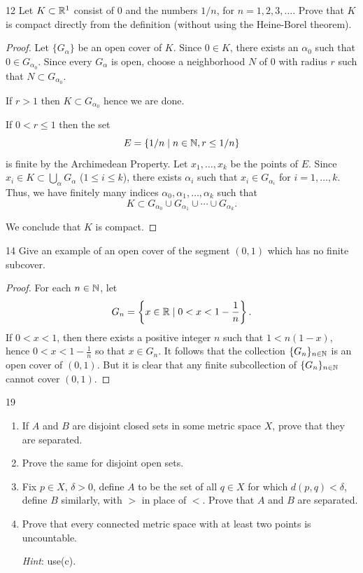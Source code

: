 \begin{exercise}{12}
Let $K \subset \mathbb{R}^1$ consist of $0$ and the numbers $1/n$, for $n=1,2,3,\ldots$. 
Prove that $K$ is compact directly from the definition (without using the Heine-Borel theorem).
\end{exercise}
\begin{proof}
Let $\{G_{\alpha}\}$ be an open cover of $K$.
Since $0 \in K$, there exists an $\alpha_0$ such that $0 \in G_{\alpha_0}$.
Since every $G_\alpha$ is open, choose a neighborhood $N$ of $0$ with radius $r$ such that $N \subset G_{\alpha_0}$.

If $r>1$ then $K \subset G_{\alpha_0}$ hence we are done. 

If $0 < r \leq 1$ then the set 
\begin{equation*}
E=\left\{1/n \mid n \in \mathbb{N}, r \leq 1/n \right\}
\end{equation*}
is finite by the Archimedean Property.
Let $x_1, \ldots, x_k$ be the points of $E$.
Since $x_i \in K \subset \bigcup_{\alpha} G_{\alpha}$ ($1 \leq i \leq k$), there exists $\alpha_i$ such that $x_i \in G_{\alpha_i}$ for $i=1, \ldots, k$.
Thus, we have finitely many indices $\alpha_0, \alpha_1, \ldots, \alpha_k$ such that
\[
K \subset G_{\alpha_0} \cup G_{\alpha_1} \cup \cdots \cup G_{\alpha_k}.
\]

We conclude that $K$ is compact.
\end{proof}

\begin{exercise}{14}
Give an example of an open cover of the segment $(0,1)$ which has no finite subcover.
\end{exercise}
\begin{proof}
For each $n \in \mathbb{N}$, let
\[
G_n=\left\{x \in \mathbb{R} \mid 0<x<1-\frac{1}{n}\right\}.
\]
If $0<x<1$, then there exists a positive integer $n$ such that $1<n(1-x)$, hence $0<x<1-\frac{1}{n}$ so that $x \in G_n$.
It follows that the collection $\{G_n\}_{n \in \mathbb{N}}$ is an open cover of $(0,1)$.
But it is clear that any finite subcollection of $\{G_n\}_{n \in \mathbb{N}}$ cannot cover $(0,1)$.
\end{proof}

\begin{exercise}{19} \,
\begin{enumerate}
\item[(a)] If $A$ and $B$ are disjoint closed sets in some metric space $X$, prove that they are separated.
\item[(b)] Prove the same for disjoint open sets.
\item[(c)] Fix $p \in X$, $\delta > 0$, define $A$ to be the set of all $q \in X$ for which $d(p,q) < \delta$, define $B$ similarly, with $>$ in place of $<$. Prove that $A$ and $B$ are separated.
\item[(d)] Prove that every connected metric space with at least two points is uncountable.

\emph{Hint}: use(c).
\end{enumerate}
\end{exercise}

